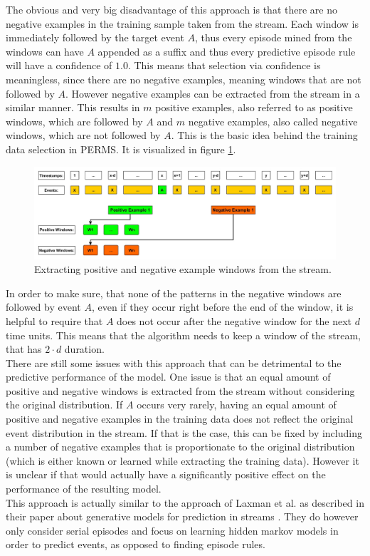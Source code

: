 The obvious and very big disadvantage of this approach is that there are no negative examples in the training sample taken from the stream. Each window is immediately followed by the target event $A$, thus every episode mined from the windows can have $A$ appended as a suffix and thus every predictive episode rule will have a confidence of $1.0$. This means that selection via confidence is meaningless, since there are no negative examples, meaning windows that are not followed by $A$. However negative examples can be extracted from the stream in a similar manner. This results in $m$ positive examples, also referred to as positive windows, which are followed by $A$ and $m$ negative examples, also called negative windows, which are not followed by $A$. This is the basic idea behind the training data selection in PERMS. It is visualized in figure \ref{fig_trainingDataPositiveAndNegativeWindows}. 

\begin{figure}[h]
	\centering
  	\includegraphics[width=\textwidth]{trainingDataPositiveAndNegativeWindows}
	\caption[Training Data Selection]{Extracting positive and negative example windows from the stream.}
	\label{fig_trainingDataPositiveAndNegativeWindows}
\end{figure}

In order to make sure, that none of the patterns in the negative windows are followed by event $A$, even if they occur right before the end of the window, it is helpful to require that $A$ does not occur after the negative window for the next $d$ time units. This means that the algorithm needs to keep a window of the stream, that has $2\cdot d$ duration.\\
There are still some issues with this approach that can be detrimental to the predictive performance of the model. One issue is that an equal amount of positive and negative windows is extracted from the stream without considering the original distribution. If $A$ occurs very rarely, having an equal amount of positive and negative examples in the training data does not reflect the original event distribution in the stream. If that is the case, this can be fixed by including a number of negative examples that is proportionate to the original distribution (which is either known or learned while extracting the training data). However it is unclear if that would actually have a significantly positive effect on the performance of the resulting model. \\
This approach is actually similar to the approach of Laxman et al. as described in their paper about generative models for prediction in streams \cite{laxman2008stream}. They do however only consider serial episodes and focus on learning hidden markov models in order to predict events, as opposed to finding episode rules.


